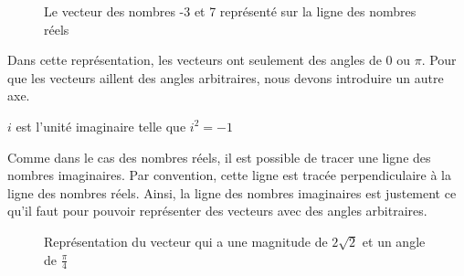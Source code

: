 \begin{figure}[!htbp]
\begin{center}
\def\numberLineLastNumber{7}
\end{center}
\caption{Le vecteur des nombres -3 et 7 représenté sur la ligne des nombres réels}
\end{figure}
\begin{remark}
    Dans cette représentation, les vecteurs ont seulement des angles de 0 ou $\pi$. Pour que les vecteurs aillent des angles arbitraires, nous devons introduire un autre axe.
\end{remark}
\begin{definition}
    $i$ est l'unité imaginaire telle que $i^2 = -1$ 
\end{definition}
Comme dans le cas des nombres réels, il est possible de tracer une ligne des nombres imaginaires. Par convention, cette ligne est tracée perpendiculaire à la ligne des nombres réels. Ainsi, la ligne des nombres imaginaires est justement ce qu'il faut pour pouvoir représenter des vecteurs avec des angles arbitraires. 
\begin{figure}[!htbp]
\begin{center}
\end{center}
\caption{Représentation du vecteur qui a une magnitude de $2\sqrt{2}$ et un angle de $\frac{\pi}{4}$}
\label{complex_plane}
\end{figure}

